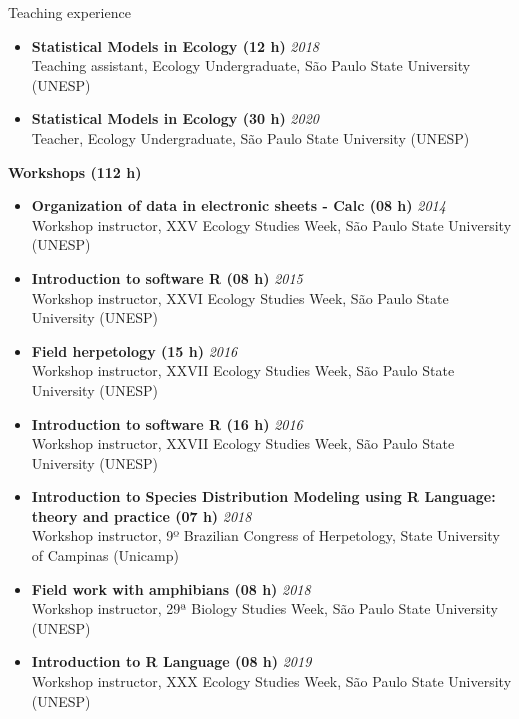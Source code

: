\documentclass{resume}
\begin{document}
\begin{rSection}{Teaching experience}
\begin{itemize}
\item {\bf Statistical Models in Ecology (12 h)} \hfill{\em 2018}\\
Teaching assistant, Ecology Undergraduate, São Paulo State University (UNESP)

\item {\bf Statistical Models in Ecology (30 h)} \hfill{\em 2020}\\
Teacher, Ecology Undergraduate, São Paulo State University (UNESP)

\end{itemize}

{\bf Workshops (112 h)}
\begin{itemize}
\item {\bf Organization of data in electronic sheets - Calc (08 h)} \hfill{\em 2014}\\
Workshop instructor, XXV Ecology Studies Week, São Paulo State University (UNESP) 

\item {\bf Introduction to software R (08 h)} \hfill{\em 2015}\\
Workshop instructor, XXVI Ecology Studies Week, São Paulo State University (UNESP) 

\item {\bf Field herpetology (15 h)} \hfill{\em 2016}\\
Workshop instructor, XXVII Ecology Studies Week, São Paulo State University (UNESP) 

\item {\bf Introduction to software R (16 h)} \hfill{\em 2016}\\
Workshop instructor, XXVII Ecology Studies Week, São Paulo State University (UNESP) 

\item {\bf Introduction to Species Distribution Modeling using R Language: theory and practice (07 h)} \hfill{\em 2018}\\
Workshop instructor, 9º Brazilian Congress of Herpetology, State University of Campinas (Unicamp)

\item {\bf Field work with amphibians (08 h)} \hfill{\em 2018}\\
Workshop instructor, 29ª Biology Studies Week, São Paulo State University (UNESP) 

\item {\bf Introduction to R Language (08 h)} \hfill{\em 2019}\\
Workshop instructor, XXX Ecology Studies Week, São Paulo State University (UNESP) 


\end{itemize}
\end{rSection}
\end{document}
